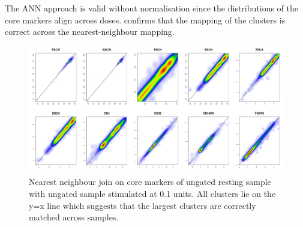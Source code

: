The \gls{ANN} approach is valid without normalisation since the distributions of the core markers align across doses.
 confirms that the mapping of the clusters is correct across the nearest-neighbour mapping.
\begin{figure}[h]
\centering
\includegraphics[scale=.3]{IL2/figures/ann-join-0U-01U.pdf}
{Nearest neighbour join on core markers of ungated resting sample with ungated sample stimulated at 0.1 units. }
{
All clusters lie on the y=x line which suggests that the largest clusters are correctly matched across samples.
}
\end{figure} 
